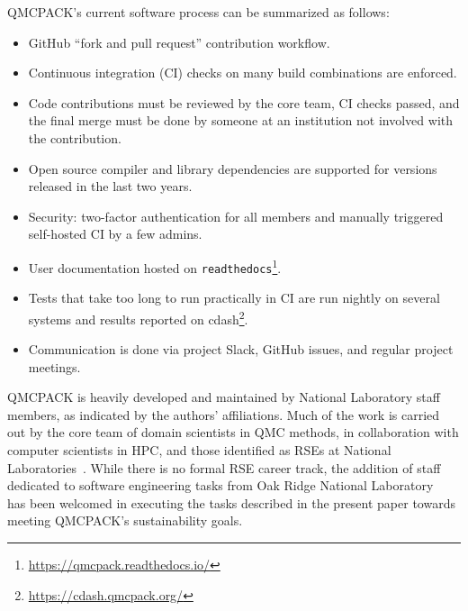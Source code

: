 QMCPACK's current software process can be summarized as follows: 

\begin{itemize}
    \item GitHub ``fork and pull request'' contribution workflow.
    \item Continuous integration (CI) checks on many build combinations are enforced.
    \item Code contributions must be reviewed by the core team, CI checks passed, and the final merge must be done by someone at an institution not involved with the contribution.
    \item Open source compiler and library dependencies are supported for versions released in the last two years.
    \item Security: two-factor authentication for all members and manually triggered self-hosted CI by a few admins.
    \item User documentation hosted on \texttt{readthedocs}\footnote{\url{https://qmcpack.readthedocs.io/}}.
    \item Tests that take too long to run practically in CI are run nightly on several systems and results reported on cdash\footnote{\url{https://cdash.qmcpack.org/}}.
    \item Communication is done via project Slack, GitHub issues, and regular project meetings.
\end{itemize}

QMCPACK is heavily developed and maintained by National Laboratory staff members, as indicated by the authors' affiliations. Much of the work is carried out by the core team of domain scientists in QMC methods, in collaboration with computer scientists in HPC, and those identified as RSEs at National Laboratories~\cite{10071971}. While there is no formal RSE career track, the addition of staff dedicated to software engineering tasks from Oak Ridge National Laboratory~\cite{10078175} has been welcomed in executing the tasks described in the present paper towards meeting QMCPACK's sustainability goals.
